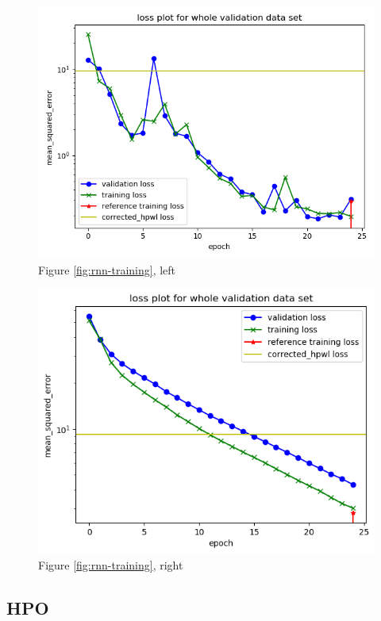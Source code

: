 \begin{figure}[H]
\includegraphics[width=\linewidth]{plots/rnn-training-history-3_lstm_layers_2_dense_layers_inflating.png}
\caption{Figure \ref{fig:rnn-training}, left}
\end{figure}

\begin{figure}[H]
\includegraphics[width=\linewidth]{plots/rnn-training-history-1_lstm_layers_1_dense_layers_inflating.png}
\caption{Figure \ref{fig:rnn-training}, right}
\end{figure}

\subsection{\gls{HPO}}

